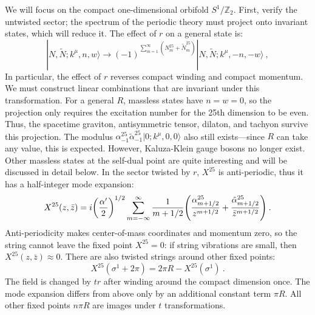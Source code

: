 We will focus on the compact one-dimensional orbifold $S^{1} / \mathds{Z}_{2}$. First, verify the untwisted sector; the spectrum of the periodic theory must project onto invariant states, which will reduce it. The effect of $r$ on a general state is:
\begin{equation}
	|N, \tilde{N} ; k^{\mu}, n, w \rangle \rightarrow 
	(-1)^{\sum_{m=1}^{\infty}(N_{m}^{25}+\tilde{N}_{m}^{25})}|N, \tilde{N} ; k^{\mu},-n,-w\rangle \:, \label{8.5.5}
\end{equation}
In particular, the effect of $r$ reverses compact winding and compact momentum. We must construct linear combinations that are invariant under this transformation. For a general $R$, massless states have $n=w=0$, so the projection only requires the excitation number for the 25th dimension to be even. 
Thus, the spacetime graviton, antisymmetric tensor, dilaton, and tachyon survive this projection. The modulus $\alpha_{-1}^{25} \tilde{\alpha}_{-1}^{25}|0 ; k^{\mu}, 0,0\rangle$ also still exists—since $R$ can take any value, this is expected. However, Kaluza-Klein gauge bosons no longer exist. Other massless states at the self-dual point are quite interesting and will be discussed in detail below. 
In the sector twisted by $r$, $X^{25}$ is anti-periodic, thus it has a half-integer mode expansion:
\begin{equation}
	X^{25}(z, \bar{z})= i\biggl(\frac{\alpha^{\prime}}{2}\biggr)^{1/2} 
	\sum_{m=-\infty}^{\infty} \frac{1}{m+1/2}\Biggl(\frac{\alpha_{m + 1/2}^{25}}{z^{m + 1/2}} 
	+ \frac{\tilde{\alpha}_{m+ 1/2}^{25}}{\bar{z}^{m + 1/2}}\Biggr) \:. \label{8.5.6}
\end{equation}
Anti-periodicity makes center-of-mass coordinates and momentum zero, so the string cannot leave the fixed point $X^{25}=0$: if string vibrations are small, then $X^{25}(z, \bar{z}) \approx 0 $. There are also twisted strings around other fixed points:
\begin{equation}
	X^{25}(\sigma^{1}+2 \pi)=2 \pi R-X^{25}(\sigma^{1}) \:. \label{8.5.7}
\end{equation}
The field is changed by $t r$ after winding around the compact dimension once. The mode expansion differs from above only by an additional constant term $\pi R$. 
All other fixed points $n \pi R$ are images under $t$ transformations.

